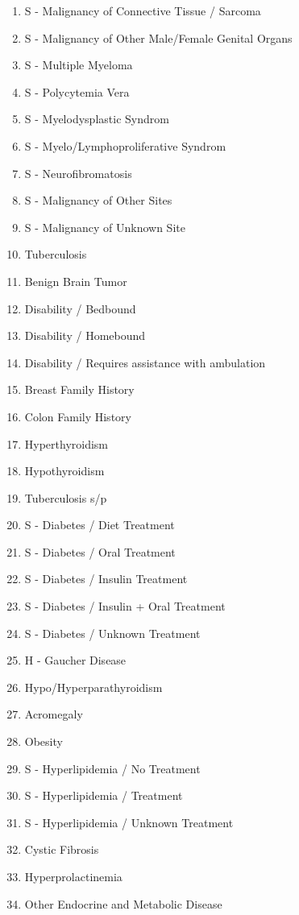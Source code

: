 \documentclass[a4paper,12pt]{article}
\begin{document}
\begin{appendices}
\begin{enumerate}
   			\item S - Malignancy of Connective Tissue / Sarcoma
   			\item S - Malignancy of Other Male/Female Genital Organs
   			\item S - Multiple Myeloma
   			\item S - Polycytemia Vera
   			\item S - Myelodysplastic Syndrom
   			\item S - Myelo/Lymphoproliferative Syndrom
   			\item S - Neurofibromatosis
   			\item S - Malignancy of Other Sites
   			\item S - Malignancy of Unknown Site
   			\item Tuberculosis
   			\item Benign Brain Tumor
   			\item Disability / Bedbound
   			\item Disability / Homebound
   			\item Disability / Requires assistance with ambulation
   			\item Breast Family History
   			\item Colon Family History
   			\item Hyperthyroidism
   			\item Hypothyroidism
   			\item Tuberculosis s/p
   			\item S - Diabetes / Diet Treatment
   			\item S - Diabetes / Oral Treatment
   			\item S - Diabetes / Insulin Treatment
   			\item S - Diabetes / Insulin + Oral Treatment
   			\item S - Diabetes / Unknown Treatment
   			\item H - Gaucher Disease
   			\item Hypo/Hyperparathyroidism
   			\item Acromegaly
   			\item Obesity
   			\item S - Hyperlipidemia / No Treatment
   			\item S - Hyperlipidemia / Treatment
   			\item S - Hyperlipidemia / Unknown Treatment
   			\item Cystic Fibrosis
   			\item Hyperprolactinemia
   			\item Other Endocrine and Metabolic Disease

\end{enumerate}
\end{appendices}
\end{document}
